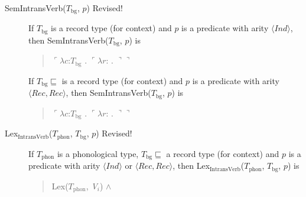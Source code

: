 \begin{description}
      \item[\textnormal{SemIntransVerb($T_{\mathrm{bg}}$, $p$)} Revised!]
        \mbox{}

        If $T_{\text{bg}}$ is a record type (for context) and $p$ is a
        predicate with arity $\langle\textit{Ind}\rangle$, then SemIntransVerb($T_{\mathrm{bg}}$, $p$) is
        \begin{quote}
          $\ulcorner\lambda c$:$T_{\mathrm{bg}}$ . $\ulcorner\lambda
          r$:
          . $\urcorner\urcorner$
        \end{quote}

        If $T_{\text{bg}}\sqsubseteq$ is a record type (for context) and $p$ is a
        predicate with arity $\langle\textit{Rec}, \textit{Rec}\rangle$, then SemIntransVerb($T_{\mathrm{bg}}$, $p$) is
        \begin{quote}
          $\ulcorner\lambda c$:$T_{\mathrm{bg}}$ . $\ulcorner\lambda
          r$:
          . $\urcorner\urcorner$
        \end{quote}

        
      \item[\textnormal{Lex$_{\mathrm{IntransVerb}}$($T_{\mathrm{phon}}$,
          $T_{\mathrm{bg}}$, $p$)} Revised!] \mbox{}


        If $T_{\mathrm{phon}}$ is a phonological type,
        $T_{\mathrm{bg}}\sqsubseteq$ a record type (for context) and $p$ is a
        predicate with arity $\langle\textit{Ind}\rangle$ or $\langle\textit{Rec}, \textit{Rec}\rangle$, then Lex$_{\mathrm{IntransVerb}}$($T_{\mathrm{phon}}$,
        $T_{\mathrm{bg}}$, $p$) is
        \begin{quote}
          Lex($T_{\mathrm{phon}}$, \textit{V$_i$}) \d{$\wedge$}
        \end{quote}


\end{description}

